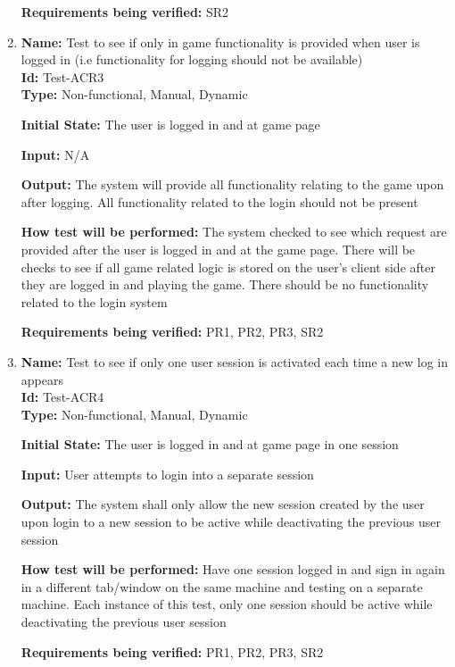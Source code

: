 \documentclass[12pt, titlepage]{article}
\begin{document}
\begin{enumerate}
    \textbf{Requirements being verified:} SR2
    
    \item{\textbf{Name:} Test to see if only in game functionality is provided when user is logged in (i.e functionality for logging should not be available)\\} \label{Test-ACR3}
    \textbf{Id: }Test-ACR3\\
    
    \textbf{Type:} Non-functional, Manual, Dynamic
    					
    \textbf{Initial State:} The user is logged in and at game page
    					
    \textbf{Input:} N/A
    					
    \textbf{Output:} The system will provide all functionality relating to the game upon after logging. All functionality related to the login should not be present 
    					
    \textbf{How test will be performed:} The system checked to see which request are provided after the user is logged in and at the game page. There will be checks to see if all game related logic is stored on the user's client side after they are logged in and playing the game. There should be no functionality related to the login system 
    
    \textbf{Requirements being verified:} PR1, PR2, PR3, SR2
    
    \item{\textbf{Name:} Test to see if only one user session is activated each time a new log in appears\\} \label{Test-ACR4}
    \textbf{Id: }Test-ACR4\\
    
    \textbf{Type:} Non-functional, Manual, Dynamic
    					
    \textbf{Initial State:} The user is logged in and at game page in one session
    					
    \textbf{Input:} User attempts to login into a separate session
    					
    \textbf{Output:} The system shall only allow the new session created by the user upon login to a new session to be active while deactivating the previous user session
    					
    \textbf{How test will be performed:} Have one session logged in and sign in again in a different tab/window on the same machine and testing on a separate machine. Each instance of this test, only one session should be active while deactivating the previous user session 
    
    \textbf{Requirements being verified:} PR1, PR2, PR3, SR2
    
\end{enumerate}
\end{document}
